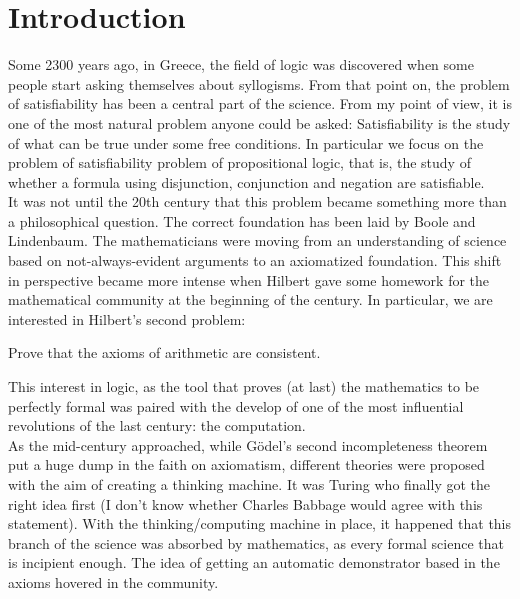 
\chapter{Introduction}
Some 2300 years ago, in Greece,  the field of logic was discovered when some people start asking themselves about syllogisms. From that point on, the problem of satisfiability has been a central part of the science.  From my point of view, it is one of the most natural problem anyone could be asked:  Satisfiability is the study of what can be true under some free conditions. In particular we focus on the problem of satisfiability problem of propositional logic, that is, the study of whether a formula using disjunction, conjunction and negation are satisfiable.\\

It was not until the 20th century that this problem became something more than a philosophical question. The correct foundation has been laid by Boole and Lindenbaum. The mathematicians were moving from an understanding of science based on not-always-evident arguments to an axiomatized foundation. This shift in perspective became more intense when Hilbert gave some homework for the mathematical community at the beginning of the century. In particular, we are interested in Hilbert's second problem:


\begin{quoting}
Prove that the axioms of arithmetic are consistent. 
\end{quoting}

This interest in logic, as the tool that proves (at last) the mathematics to be perfectly formal was paired with the develop of one of the most influential revolutions of the last century: the computation.\\

As the mid-century approached, while Gödel's second incompleteness theorem put a huge dump in the faith on axiomatism,  different theories were proposed with the aim of creating a thinking machine. It was Turing who finally got the right idea first (I don't know whether Charles Babbage would agree with this statement). With the thinking/computing machine in place, it happened that this branch of the science was absorbed by mathematics, as every formal science that is incipient enough.  The idea of getting an automatic demonstrator based in the axioms hovered in the community.\\


